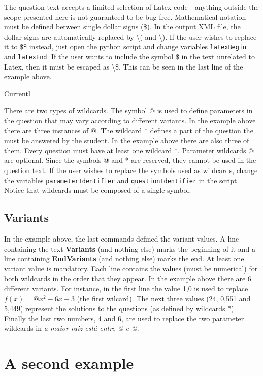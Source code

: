 \documentclass[11pt]{article}
\begin{document}
The question text accepts a limited selection of Latex code - anything outside the scope presented here is not guaranteed to be bug-free. Mathematical notation must be defined between single dollar signs (\$). In the output XML file, the dollar signs are automatically replaced by \textbackslash( and \textbackslash). If the user wishes to replace it to \$\$ instead, just open the python script and change variables \texttt{latexBegin} and \texttt{latexEnd}. If the user wants to include the symbol \$ in the text unrelated to Latex, then it must be escaped as \textbackslash\$. This can be seen in the last line of the example above.

Currentl

There are two types of wildcards. The symbol @ is used to define parameters in the question that may vary according to different variants. In the example above there are three instances of @. The wildcard * defines a part of the question the must be answered by the student. In the example above there are also three of them. Every question must have at least one wildcard *. Parameter wildcards @ are optional. Since the symbols @ and * are reserved, they cannot be used in the question text. If the user wishes to replace the symbols used as wildcards, change the variables \texttt{parameterIdentifier} and \texttt{questionIdentifier} in the script. Notice that wildcards must be composed of a single symbol.

\subsection{Variants}

In the example above, the last commands defined the variant values. A line containing the text {\bf Variants} (and nothing else) marks the beginning of it and a line containing {\bf EndVariants} (and nothing else) marks the end. At least one variant value is mandatory. Each line contains the values (must be numerical) for both wildcards in the order that they appear. In the example above there are 6 different variants. For instance, in the first line the value 1,0 is used to replace $f(x) = @x^2 - 6x + 3$ (the first wilcard). The next three values (24, 0,551 and 5,449) represent the solutions to the questions (as defined by wildcards *). Finally the last two numbers, 4 and 6, are used to replace the two parameter wildcards in \textit{a maior raiz está entre @ e @}.


\section{A second example}
\end{document}
